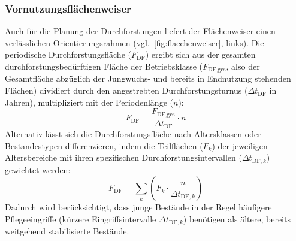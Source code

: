 \documentclass[twocolumn, paper=a4, fontsize=10pt]{scrartcl}
\begin{document}
\subsubsection{Vornutzungsflächenweiser}

Auch für die Planung der Durchforstungen liefert der Flächenweiser einen verlässlichen Orientierungsrahmen (vgl.\ \cref{fig:flaechenweiser}, links). Die periodische Durchforstungsfläche ($F_{\text{DF}}$) ergibt sich aus der gesamten durchforstungsbedürftigen Fläche der Betriebsklasse ($F_{\text{DF,ges}}$, also der Gesamtfläche abzüglich der Jungwuchs- und bereits in Endnutzung stehenden Flächen) dividiert durch den angestrebten Durchforstungsturnus ($\Delta t_{\text{DF}}$ in Jahren), multipliziert mit der Periodenlänge ($n$):
\begin{equation}
    \label{eq:fdf_gesamt}
    F_{\text{DF}} = \frac{F_{\text{DF,ges}}}{\Delta t_{\text{DF}}} \cdot n
\end{equation}
Alternativ lässt sich die Durchforstungsfläche nach Altersklassen oder Bestandestypen differenzieren, indem die Teilflächen ($F_k$) der jeweiligen Altersbereiche mit ihren spezifischen Durchforstungsintervallen ($\Delta t_{\text{DF},k}$) gewichtet werden:
\begin{equation}
    \label{eq:fdf_typen}
    F_{\text{DF}} = \sum_{k} \left( F_k \cdot \frac{n}{\Delta t_{\text{DF},k}} \right)
\end{equation}
Dadurch wird berücksichtigt, dass junge Bestände in der Regel häufigere Pflegeeingriffe (kürzere Eingriffsintervalle $\Delta t_{\text{DF},k}$) benötigen als ältere, bereits weitgehend stabilisierte Bestände.
\end{document}
